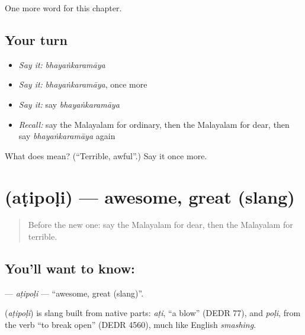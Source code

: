 \begin{grammarlens}[title={What you've built}]
One more word for this chapter.
\end{grammarlens}

\subsection*{Your turn}
\begin{itemize}
\raggedright
  \item \emph{Say it:} \emph{bhayaṅkaramāya}
  \item \emph{Say it:} \emph{bhayaṅkaramāya}, once more
  \item \emph{Say it:} say \emph{bhayaṅkaramāya}
  \item \emph{Recall:} say the Malayalam for ordinary, then the Malayalam for dear, then say \emph{bhayaṅkaramāya} again
\end{itemize}

\begin{tcolorbox}[breakable,colback=teal!4,colframe=teal!35!black,title={Before you move on}]
What does  mean? (\textquotedblleft{}Terrible, awful\textquotedblright{}.) Say it once more.
\end{tcolorbox}
\section[\texorpdfstring{\ml{അടിപൊളി} (aṭipoḷi)}{അടിപൊളി (aṭipoḷi)}]{ (aṭipoḷi) — awesome, great (slang)}

\label{lesson:ML-C320-atipoli}



\begin{quote}
Before the new one: say the Malayalam for dear, then the Malayalam for terrible.
\end{quote}

\subsection*{You'll want to know: }
\textbf{} — \emph{aṭipoḷi} — \textquotedblleft{}awesome, great (slang)\textquotedblright{}.

\begin{cousinweb}
\textbf{} (\emph{aṭipoḷi}) is slang built from native parts: \emph{aṭi}, \textquotedblleft{}a blow\textquotedblright{} (DEDR 77), and \emph{poḷi}, from the verb \textquotedblleft{}to break open\textquotedblright{} (DEDR 4560), much like English \emph{smashing}.
\end{cousinweb}

